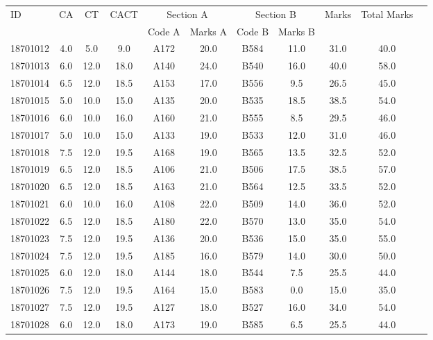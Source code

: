 \documentclass[12pt]{article}
\begin{document}
    \begin{center} 
	\renewcommand{\arraystretch}{1.08}
	\begin{small}
    \begin{tabular}{|l|c|c|c|c|c|c|c|c|c|c|} \hline
	\multirow{2}{*}{ID} & 	\multirow{2}{*}{CA}  & 	\multirow{2}{*}{CT}  & 	\multirow{2}{*}{CACT}  & \multicolumn{2 }{|c|}{Section A}& \multicolumn{2 }{c|}{Section B} & 	\multirow{2}{*}{Marks}  & 	\multirow{2}{*}{Total Marks}  \\ 
	&  &  &  & Code A & Marks A & Code B & Marks B&  &  \\ \hline
18701012 & 4.0 & 5.0 & 9.0 & A172 & 20.0 & B584 & 11.0 & 31.0 & 40.0\\ \hline 
18701013 & 6.0 & 12.0 & 18.0 & A140 & 24.0 & B540 & 16.0 & 40.0 & 58.0\\ \hline 
18701014 & 6.5 & 12.0 & 18.5 & A153 & 17.0 & B556 & 9.5 & 26.5 & 45.0\\ \hline 
18701015 & 5.0 & 10.0 & 15.0 & A135 & 20.0 & B535 & 18.5 & 38.5 & 54.0\\ \hline 
18701016 & 6.0 & 10.0 & 16.0 & A160 & 21.0 & B555 & 8.5 & 29.5 & 46.0\\ \hline 
18701017 & 5.0 & 10.0 & 15.0 & A133 & 19.0 & B533 & 12.0 & 31.0 & 46.0\\ \hline 
18701018 & 7.5 & 12.0 & 19.5 & A168 & 19.0 & B565 & 13.5 & 32.5 & 52.0\\ \hline 
18701019 & 6.5 & 12.0 & 18.5 & A106 & 21.0 & B506 & 17.5 & 38.5 & 57.0\\ \hline 
18701020 & 6.5 & 12.0 & 18.5 & A163 & 21.0 & B564 & 12.5 & 33.5 & 52.0\\ \hline 
18701021 & 6.0 & 10.0 & 16.0 & A108 & 22.0 & B509 & 14.0 & 36.0 & 52.0\\ \hline 
18701022 & 6.5 & 12.0 & 18.5 & A180 & 22.0 & B570 & 13.0 & 35.0 & 54.0\\ \hline 
18701023 & 7.5 & 12.0 & 19.5 & A136 & 20.0 & B536 & 15.0 & 35.0 & 55.0\\ \hline 
18701024 & 7.5 & 12.0 & 19.5 & A185 & 16.0 & B579 & 14.0 & 30.0 & 50.0\\ \hline 
18701025 & 6.0 & 12.0 & 18.0 & A144 & 18.0 & B544 & 7.5 & 25.5 & 44.0\\ \hline 
18701026 & 7.5 & 12.0 & 19.5 & A164 & 15.0 & B583 & 0.0 & 15.0 & 35.0\\ \hline 
18701027 & 7.5 & 12.0 & 19.5 & A127 & 18.0 & B527 & 16.0 & 34.0 & 54.0\\ \hline 
18701028 & 6.0 & 12.0 & 18.0 & A173 & 19.0 & B585 & 6.5 & 25.5 & 44.0\\ \hline 

\end{tabular}
\end{small}
\end{center}
\end{document}
